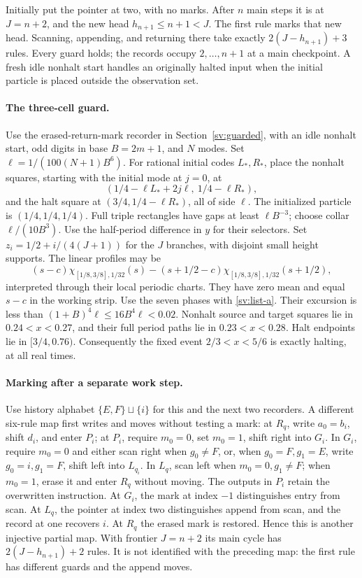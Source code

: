 Initially put the pointer at two, with no marks.  After $n$ main steps
it is at $J=n+2$, and the new head $h_{n+1}\le n+1<J$.
The first rule marks that new head.  Scanning, appending, and returning
there take exactly $2(J-h_{n+1})+3$ rules.  Every guard holds; the
records occupy $2,\ldots,n+1$ at a main checkpoint.  A fresh idle
nonhalt start handles an originally halted input when the initial
particle is placed outside the observation set.

\paragraph{The three-cell guard.}
Use the erased-return-mark recorder in Section~\ref{sv:guarded}, with
an idle nonhalt start, odd digits in base $B=2m+1$, and $N$ modes.
Set $\ell=1/(100(N+1)B^6)$.  For rational initial codes $L_*,R_*$,
place the nonhalt squares, starting with the initial mode at $j=0$, at
\[
 (1/4-\ell L_*+2j\ell,\ 1/4-\ell R_*),
\]
and the halt square at $(3/4,1/4-\ell R_*)$, all of side $\ell$.
The initialized particle is $(1/4,1/4,1/4)$.  Full triple rectangles
have gaps at least $\ell B^{-3}$; choose collar $\ell/(10B^3)$.
Use the half-period difference in $y$ for their selectors.  Set
$z_i=1/2+i/(4(J+1))$ for the $J$ branches, with disjoint small
height supports.  The linear profiles may be
\[
 (s-c)\chi_{[1/8,3/8],1/32}(s)
 -(s+1/2-c)\chi_{[1/8,3/8],1/32}(s+1/2),
\]
interpreted through their local periodic charts.  They have zero mean
and equal $s-c$ in the working strip.  Use the seven phases with
\eqref{sv:list-a}.  Their excursion is less than
$(1+B)^4\ell\le16B^4\ell<0.02$.  Nonhalt source and target
squares lie in $0.24<x<0.27$, and their full period paths lie in
$0.23<x<0.28$.  Halt endpoints lie in $[3/4,0.76)$.
Consequently the fixed event $2/3<x<5/6$ is exactly halting, at all
real times.

\paragraph{Marking after a separate work step.}
Use history alphabet $\{E,F\}\sqcup\{i\}$ for this and the
next two recorders. A different six-rule map first writes and moves
without testing a mark:
at $R_q$, write $a_0=b_i$, shift $d_i$, and enter $P_i$;
at $P_i$, require $m_0=0$, set $m_0=1$, shift right into $G_i$.
In $G_i$, require $m_0=0$ and either scan right when $g_0\ne F$,
or, when $g_0=F,g_1=E$, write $g_0=i,g_1=F$, shift left into
$L_{q_i}$.  In $L_q$, scan left when $m_0=0,g_1\ne F$;
when $m_0=1$, erase it and enter $R_q$ without moving.
The outputs in $P_i$ retain the overwritten instruction.  At $G_i$,
the mark at index $-1$ distinguishes entry from scan.  At $L_q$,
the pointer at index two distinguishes append from scan, and the record
at one recovers $i$.  At $R_q$ the erased mark is restored.  Hence this
is another injective partial map.  With frontier $J=n+2$ its main
cycle has $2(J-h_{n+1})+2$ rules.  It is not identified with the
preceding map: the first rule has different guards and the append moves.

